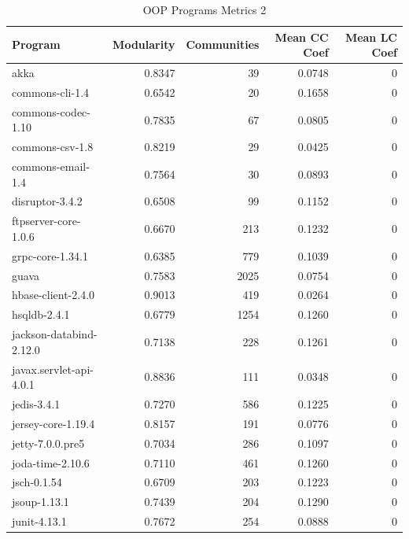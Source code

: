 \documentclass[12pt, a4paper]{article}
\begin{document}
\begin{longtable}[H]{l r r r r}
    \caption{OOP Programs Metrics 2}\label{table:oop_metrics_2}\\
        Program & Modularity & Communities & Mean CC Coef & Mean LC Coef \\
        \hline            
        \endhead
        akka                          &  0.8347 &    39 &  0.0748 & 0 \\  
        commons-cli-1.4               &  0.6542 &    20 &  0.1658 & 0 \\  
        commons-codec-1.10            &  0.7835 &    67 &  0.0805 & 0 \\  
        commons-csv-1.8               &  0.8219 &    29 &  0.0425 & 0 \\  
        commons-email-1.4             &  0.7564 &    30 &  0.0893 & 0 \\  
        disruptor-3.4.2               &  0.6508 &    99 &  0.1152 & 0 \\  
        ftpserver-core-1.0.6          &  0.6670 &   213 &  0.1232 & 0 \\  
        grpc-core-1.34.1              &  0.6385 &   779 &  0.1039 & 0 \\  
        guava                         &  0.7583 &  2025 &  0.0754 & 0 \\  
        hbase-client-2.4.0            &  0.9013 &   419 &  0.0264 & 0 \\  
        hsqldb-2.4.1                  &  0.6779 &  1254 &  0.1260 & 0 \\  
        jackson-databind-2.12.0       &  0.7138 &   228 &  0.1261 & 0 \\  
        javax.servlet-api-4.0.1       &  0.8836 &   111 &  0.0348 & 0 \\  
        jedis-3.4.1                   &  0.7270 &   586 &  0.1225 & 0 \\  
        jersey-core-1.19.4            &  0.8157 &   191 &  0.0776 & 0 \\  
        jetty-7.0.0.pre5              &  0.7034 &   286 &  0.1097 & 0 \\  
        joda-time-2.10.6              &  0.7110 &   461 &  0.1260 & 0 \\  
        jsch-0.1.54                   &  0.6709 &   203 &  0.1223 & 0 \\  
        jsoup-1.13.1                  &  0.7439 &   204 &  0.1290 & 0 \\  
        junit-4.13.1                  &  0.7672 &   254 &  0.0888 & 0 \\  

\end{longtable}
\end{document}
